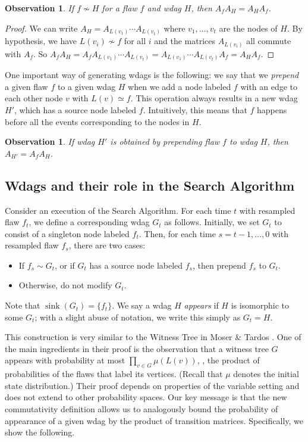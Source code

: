 \documentclass{toc}
\DeclareMathOperator{\sink}{sink}
\newtheorem{observation}[theorem]{Observation}
\begin{document}
\begin{observation}
\label{ah-prop2}
If $f \not \sim H$ for a flaw $f$ and wdag $H$, then $A_f A_H = A_H A_f$.
\end{observation}
\begin{proof}
We can write $A_H = A_{L(v_1)} \cdots A_{L(v_t)}$ where $v_1, \dots, v_t$ are the nodes of $H$. By hypothesis, we have $L(v_i) \not \sim f$ for all $i$ and the matrices $A_{L(v_i)}$ all commute with $A_f$. So $A_f A_H = A_f  A_{L(v_1)} \cdots A_{L(v_t)} = A_{L(v_1)} \cdots A_{L(v_t)} A_f  = A_H A_f.$
\end{proof}


 One important way of generating wdags is the following: we say that we   \emph{prepend} a given flaw $f$ to a given wdag $H$ when we add a node labeled $f$ with an edge to each other node $v$ with $L(v) \simeq f$.  This operation always results in a new wdag $H'$, which has a source node labeled $f$. Intuitively, this means that $f$ happens before all the events corresponding to the nodes in $H$.

\begin{observation}
If wdag $H'$ is obtained by prepending flaw $f$ to wdag $H$, then $A_{H'} = A_f A_H$.
\end{observation}

\subsection{Wdags and their role in the Search Algorithm}
\label{wdag-construct}
Consider an execution of the Search Algorithm. For each time $t$ with resampled flaw $f_t$, we define a corresponding wdag $G_{t}$  %
as follows. %
%
Initially,  %
we set $G_t$ to consist of a singleton node labeled $f_t$. Then, for each time $s = t-1, \ldots, 0$ with resampled flaw $f_s$, there are two cases:
\begin{itemize}
\item If $f_s \sim G_t$, or if $G_t$ has a source node labeled $f_s$,  then prepend $f_s$ to $G_t$.
\item Otherwise, do not modify $G_t$.
 \end{itemize}
 
Note that $\sink(G_t) = \{f_t \}$.  We say a wdag $H$ \emph{appears} if $H$ is isomorphic to some $G_t$; with a slight abuse of notation, we write this simply as $G_t = H$.  
 
  This construction is very similar to the Witness Tree in Moser \& Tardos \cite{MT}.  One of the main ingredients in their proof is the observation that a witness tree $G$ appears with probability at most $\prod_{v \in G } \mu(L(v) ) $, \ie,  the product of probabilities of the flaws that label its vertices.  (Recall  that $\mu$ denotes the initial state distribution.) Their proof depends on properties of the variable setting and does not extend to other probability spaces.  Our key message is that the new commutativity definition allows us to analogously bound the probability of appearance of a given wdag by the product of transition matrices. Specifically, we show the following. 
  
\end{document}
